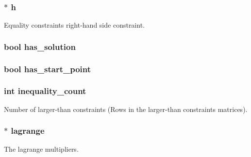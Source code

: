 \subsubsection[{h}]{$\ast$ h}\label{structproblem_a8e142e0ead965e30c731cac0c81f0546}
Equality constraints right-\/hand side constraint. \hypertarget{structproblem_af593a3f5fcf12e8513374bc6475a53d4}{}
\subsubsection[{has\+\_\+solution}]{\setlength{\rightskip}{0pt plus 5cm}bool has\+\_\+solution}\label{structproblem_af593a3f5fcf12e8513374bc6475a53d4}
\hypertarget{structproblem_a2596cd297f65ddbda474ea881a09a9e9}{}
\subsubsection[{has\+\_\+start\+\_\+point}]{\setlength{\rightskip}{0pt plus 5cm}bool has\+\_\+start\+\_\+point}\label{structproblem_a2596cd297f65ddbda474ea881a09a9e9}
\hypertarget{structproblem_a0baf6f65eaae279a86d187ef201c1320}{}
\subsubsection[{inequality\+\_\+count}]{\setlength{\rightskip}{0pt plus 5cm}int inequality\+\_\+count}\label{structproblem_a0baf6f65eaae279a86d187ef201c1320}
Number of larger-\/than constraints (Rows in the larger-\/than constraints matrices). \hypertarget{structproblem_a988084bf1423637718de8882244149f4}{}
\subsubsection[{lagrange}]{$\ast$ lagrange}\label{structproblem_a988084bf1423637718de8882244149f4}
The lagrange multipliers. \hypertarget{structproblem_a53380b3b14c20bdfcb3bc9970c421231}{}
